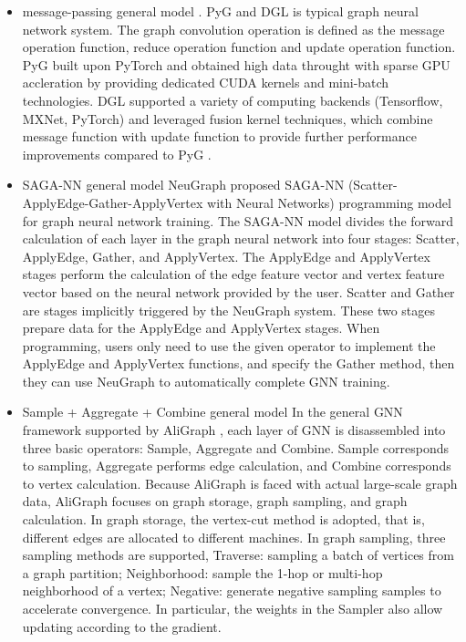 \begin{itemize}
    \item message-passing general model \cite{gilmer_messgae_passing}. PyG and DGL is typical graph neural network system.
    The graph convolution operation is defined as the message operation function, reduce operation function and update operation function.
    PyG \cite{PyG} built upon PyTorch and obtained high data throught with sparse GPU accleration by providing dedicated CUDA kernels 
    and mini-batch technologies. DGL \cite{DGL} supported a variety of computing backends (Tensorflow, MXNet, PyTorch) and leveraged
    fusion kernel techniques, which combine message function with update function to provide further performance improvements compared to PyG \cite{PyG}. 
    \item SAGA-NN general model
    NeuGraph \cite{ma2019_neugraph} proposed SAGA-NN (Scatter-ApplyEdge-Gather-ApplyVertex with Neural Networks) programming model for graph neural network training.
    The SAGA-NN model divides the forward calculation of each layer in the graph neural network into four stages: Scatter, ApplyEdge, Gather, and ApplyVertex. 
    The ApplyEdge and ApplyVertex stages perform the calculation of the edge feature vector and vertex feature vector based on the neural network provided by the user. 
    Scatter and Gather are stages implicitly triggered by the NeuGraph system. These two stages prepare data for the ApplyEdge and ApplyVertex stages. 
    When programming, users only need to use the given operator to implement the ApplyEdge and ApplyVertex functions, and specify the Gather method,
    then they can use NeuGraph to automatically complete GNN training.
    \item Sample + Aggregate + Combine general model
    In the general GNN framework supported by AliGraph \cite{zhu2019_aligraph}, 
    each layer of GNN is disassembled into three basic operators: Sample, Aggregate and Combine. 
    Sample corresponds to sampling, Aggregate performs edge calculation, 
    and Combine corresponds to vertex calculation. 
    Because AliGraph is faced with actual large-scale graph data, AliGraph focuses on graph storage, 
    graph sampling, and graph calculation. In graph storage, the vertex-cut method is adopted, 
    that is, different edges are allocated to different machines. 
    In graph sampling, three sampling methods are supported, 
    Traverse: sampling a batch of vertices from a graph partition;
    Neighborhood: sample the 1-hop or multi-hop neighborhood of a vertex;
    Negative: generate negative sampling samples to accelerate convergence. 
    In particular, the weights in the Sampler also allow updating according to the gradient.
\end{itemize}

